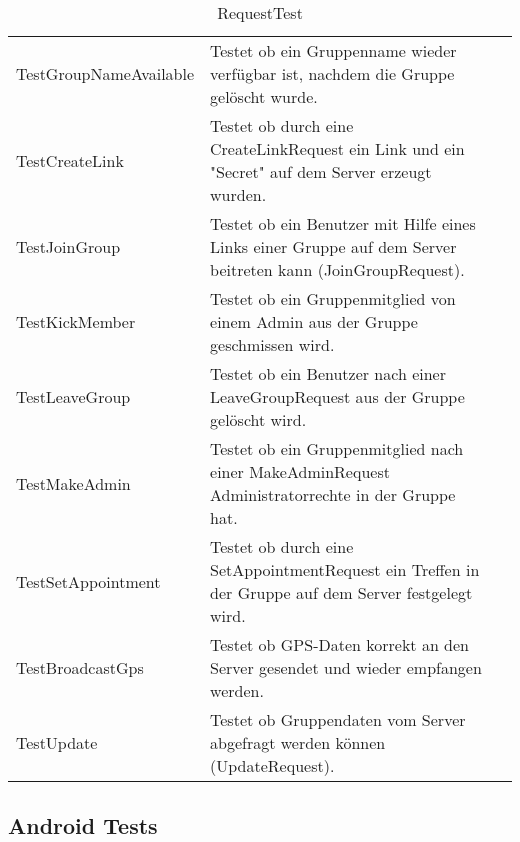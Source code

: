 \begin{table}[H]
{\begin{tabular}{|p{}|p{}|>{\centering}p{}|}
					\hspace{0pt}TestGroupNameAvailable & Testet ob ein Gruppenname wieder verfügbar ist, nachdem die Gruppe gelöscht wurde. &	\checkmark\tabularnewline
					\hspace{0pt}TestCreateLink & Testet ob durch eine CreateLinkRequest ein Link und ein "Secret" auf dem Server erzeugt wurden. &	\checkmark\tabularnewline
                         \hspace{0pt}TestJoinGroup & Testet ob ein Benutzer mit Hilfe eines Links einer Gruppe auf dem Server beitreten kann (JoinGroupRequest). &	\checkmark\tabularnewline
					\hspace{0pt}TestKickMember & Testet ob ein Gruppenmitglied von einem Admin aus der Gruppe geschmissen wird.  &	\checkmark\tabularnewline
					\hspace{0pt}TestLeaveGroup & Testet ob ein Benutzer nach einer LeaveGroupRequest aus der Gruppe gelöscht wird. &	\checkmark\tabularnewline
					\hspace{0pt}TestMakeAdmin & Testet ob ein Gruppenmitglied nach einer MakeAdminRequest Administratorrechte in der Gruppe hat. &	\checkmark\tabularnewline
					\hspace{0pt}TestSetAppointment & Testet ob durch eine SetAppointmentRequest ein Treffen in der Gruppe auf dem Server festgelegt wird. &	\checkmark\tabularnewline
					\hspace{0pt}TestBroadcastGps & Testet ob GPS-Daten korrekt an den Server gesendet und wieder empfangen werden. &	\checkmark\tabularnewline
                         \hspace{0pt}TestUpdate & Testet ob Gruppendaten vom Server abgefragt werden können (UpdateRequest). &	\checkmark\tabularnewline

					\hline
				\end{tabular}}
				\caption{RequestTest}
			\end{table}


\subsection{Android Tests}

